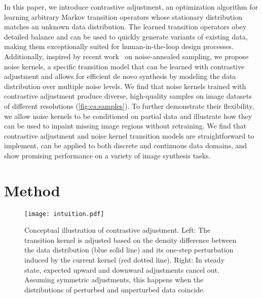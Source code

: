 \documentclass[10pt,twocolumn,letterpaper]{article}
\begin{document}
In this paper, we introduce contrastive adjustment, an optimization algorithm for learning arbitrary Markov transition operators whose stationary distribution matches an unknown data distribution.
The learned transition operators obey detailed balance and can be used to quickly generate variants of existing data, making them exceptionally suited for human-in-the-loop design processes.
Additionally, inspired by recent work~\cite{song2019generative,ho2020denoising} on noise-annealed sampling, we propose noise kernels, a specific transition model that can be learned with contrastive adjustment and allows for efficient de novo synthesis by modeling the data distribution over multiple noise levels.
We find that noise kernels trained with contrastive adjustment produce diverse, high-quality samples on image datasets of different resolutions (\cref{fig:ca:samples}).
To further demonstrate their flexibility, we allow noise kernels to be conditioned on partial data and illustrate how they can be used to inpaint missing image regions without retraining.
We find that contrastive adjustment and noise kernel transition models are straightforward to implement, can be applied to both discrete and continuous data domains, and show promising performance on a variety of image synthesis tasks.

\section{Method}

\begin{figure}[t]
  \centering
  \texttt{[image: intuition.pdf]}\caption{
    Conceptual illustration of contrastive adjustment.
    Left: The transition kernel is adjusted based on the density difference between the data distribution (blue solid line) and its one-step perturbation induced by the current kernel (red dotted line).
    Right: In steady state, expected upward and downward adjustments cancel out. Assuming symmetric adjustments, this happens when the distributions of perturbed and unperturbed data coincide.
  }\label{fig:ca:high-level}
\end{figure}
\end{document}
